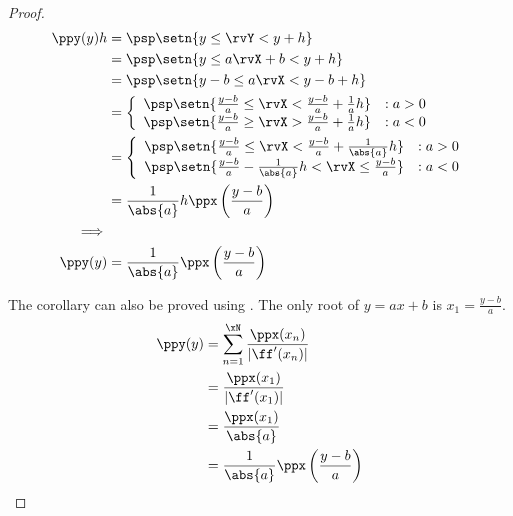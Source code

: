 \begin{corollary}
\mbox{}\\
\end{corollary}
\begin{proof}
\begin{align*}
  \ppy(y)h
    &=  \psp\setn{y\le\rvY < y+h}
  \\&=  \psp\setn{y\le a\rvX+b < y+h}
  \\&=  \psp\setn{y-b\le a\rvX < y-b+h}
  \\&=  \left\{\begin{array}{ll}
          \psp\setn{\frac{y-b}{a}\le\rvX < \frac{y-b}{a}+\frac{1}{a}h} &: a>0 \\
          \psp\setn{\frac{y-b}{a}\ge\rvX > \frac{y-b}{a}+\frac{1}{a}h} &: a<0
        \end{array}\right.
  \\&=  \left\{\begin{array}{ll}
          \psp\setn{\frac{y-b}{a}\le\rvX < \frac{y-b}{a}+\frac{1}{\abs{a}}h} &: a>0 \\
          \psp\setn{\frac{y-b}{a}-\frac{1}{\abs{a}}h <\rvX \le \frac{y-b}{a}} &: a<0
        \end{array}\right.
  \\&=  \frac{1}{\abs{a}}h \ppx\left(\frac{y-b}{a}\right)
\\\implies
\\
  \ppy(y)
    &=  \frac{1}{\abs{a}} \ppx\left(\frac{y-b}{a}\right)
\end{align*}

The corollary can also be proved using .
The only root of $y=ax+b$ is $x_1=\frac{y-b}{a}$.
\begin{align*}
  \ppy(y)
    &= \sum_{n=1}^{\xN} \frac{\ppx(x_n)}{|\ff'(x_n)|}
  \\&= \frac{\ppx(x_1)}{|\ff'(x_1)|}
  \\&= \frac{\ppx(x_1)}{\abs{a}}
  \\&= \frac{1}{\abs{a}}\ppx\left(\frac{y-b}{a}\right)
\end{align*}
\end{proof}

